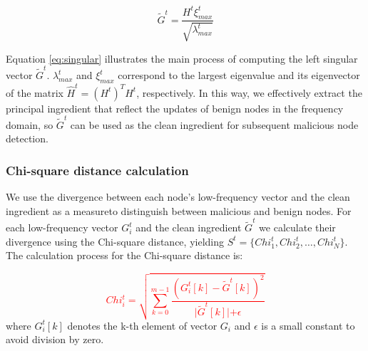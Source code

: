 \documentclass[lettersize,journal]{IEEEtran}
\begin{document}
\begin{equation}
\tilde{G}^t = \frac{H^t \xi^t_{max}}{\sqrt{\lambda^t_{max}}}
\label{eq:singular}
\end{equation}


Equation \ref{eq:singular} illustrates the main process of computing the left singular vector $\tilde{G}^t$. $\lambda^t_{max}$ and $\xi^t_{max}$ correspond to the largest eigenvalue and its eigenvector of the matrix $\hat{H}^t = (H^t)^{T} H^t$, respectively. In this way, we effectively extract the principal ingredient that reflect the updates of benign nodes in the frequency domain, so $\tilde{G}^t$ can be used as the clean ingredient for subsequent malicious node detection.

\subsubsection{Chi-square distance calculation}
We use the divergence between each node's low-frequency vector and the clean ingredient as a measureto distinguish between malicious and benign nodes. For each  low-frequency vector \(G_i^t\) and the clean ingredient \(\tilde{G}^t\) we calculate their divergence using the Chi-square distance, yielding \(S^t = \{Chi^t_1, Chi^t_2, \ldots, Chi^t_N\}\). The calculation process for the Chi-square distance is:

\textcolor{red}{
\begin{equation}
Chi^t_i = \sqrt{ \sum_{k=0}^{m-1}\frac{(G_i^t[k] - {\tilde G}^t[k])^2}{{|\tilde G}^t[k]| + \epsilon} }
\label{equation:KL}
\end{equation}}
where \(G_i^t[k]\) denotes the k-th element of vector \(G_i\) and \(\epsilon\) is a small constant to avoid division by zero. 
\end{document}
